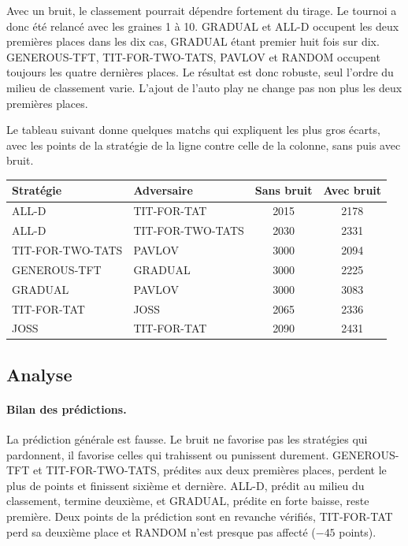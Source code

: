 \documentclass[11pt,a4paper]{article}
\begin{document}
Avec un bruit, le classement pourrait dépendre fortement du tirage. Le tournoi a donc été relancé avec les graines 1 à 10.
GRADUAL et ALL-D occupent les deux premières places dans les dix cas, GRADUAL étant premier huit fois sur dix. GENEROUS-TFT,
TIT-FOR-TWO-TATS, PAVLOV et RANDOM occupent toujours les quatre dernières places. Le résultat est donc robuste, seul
l'ordre du milieu de classement varie. L'ajout de l'auto play ne change pas non plus les deux premières places.

Le tableau suivant donne quelques matchs qui expliquent les plus gros écarts, avec les points de la stratégie de la ligne
contre celle de la colonne, sans puis avec bruit.

\begin{center}
\begin{tabular}{llcc}
\toprule
Stratégie & Adversaire & Sans bruit & Avec bruit \\
\midrule
ALL-D & TIT-FOR-TAT & 2015 & 2178 \\
ALL-D & TIT-FOR-TWO-TATS & 2030 & 2331 \\
TIT-FOR-TWO-TATS & PAVLOV & 3000 & 2094 \\
GENEROUS-TFT & GRADUAL & 3000 & 2225 \\
GRADUAL & PAVLOV & 3000 & 3083 \\
TIT-FOR-TAT & JOSS & 2065 & 2336 \\
JOSS & TIT-FOR-TAT & 2090 & 2431 \\
\bottomrule
\end{tabular}
\end{center}

\subsection{Analyse}
\paragraph{Bilan des prédictions.} La prédiction générale est fausse. Le bruit ne favorise pas les stratégies qui pardonnent,
il favorise celles qui trahissent ou punissent durement. GENEROUS-TFT et TIT-FOR-TWO-TATS, prédites aux deux premières places,
perdent le plus de points et finissent sixième et dernière. ALL-D, prédit au milieu du classement, termine deuxième, et
GRADUAL, prédite en forte baisse, reste première. Deux points de la prédiction sont en revanche vérifiés, TIT-FOR-TAT perd sa
deuxième place et RANDOM n'est presque pas affecté ($-45$ points).
\end{document}
